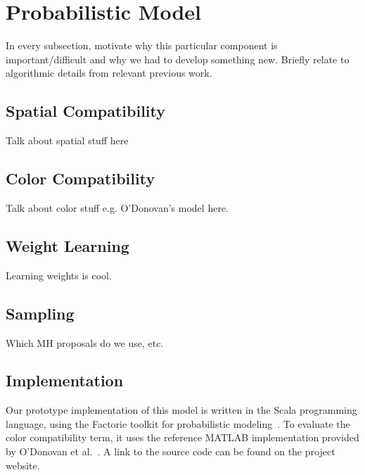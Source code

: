 \section{Probabilistic Model}
\label{sec:model}

In every subsection, motivate why this particular component is important/difficult and why we had to develop something new. Briefly relate to algorithmic details from relevant previous work.

\subsection{Spatial Compatibility}
\label{sec:spatialCompat}
Talk about spatial stuff here

\subsection{Color Compatibility}
\label{sec:colorCompat}
Talk about color stuff e.g. O'Donovan's model here.

\subsection{Weight Learning}
\label{sec:weights}
Learning weights is cool.

\subsection{Sampling}
\label{sec:sampling}
Which MH proposals do we use, etc.

\subsection{Implementation}
\label{sec:implementation}

Our prototype implementation of this model is written in the Scala programming language, using the Factorie toolkit for probabilistic modeling~\cite{Factorie}. To evaluate the color compatibility term, it uses the reference MATLAB implementation provided by O'Donovan et al.~. A link to the source code can be found on the project website.